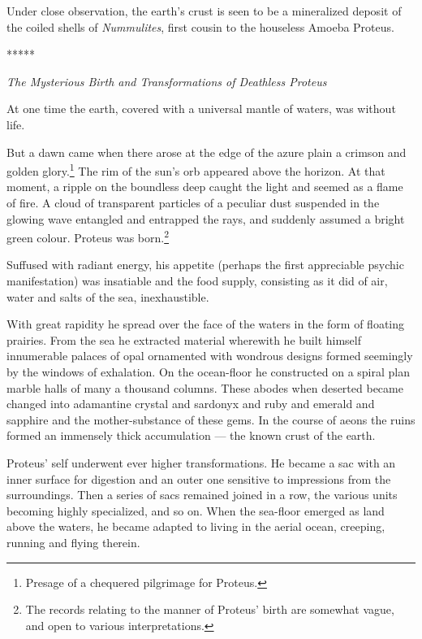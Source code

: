 \documentclass[a4paper, 12pt, oneside]{article}
\begin{document}
Under close observation, the earth's crust is seen to be a mineralized deposit of the coiled shells of \emph{Nummulites}, first cousin to the houseless Amoeba Proteus.

\centerline{*\hspace{15mm}*\hspace{15mm}*\hspace{15mm}*\hspace{15mm}*}
\bigskip

\centerline{\emph{The Mysterious Birth and Transformations of Deathless Proteus}}

At one time the earth, covered with a universal mantle of waters, was without life.

But a dawn came when there arose at the edge of the azure plain a crimson and golden glory.\footnote{Presage of a chequered pilgrimage for Proteus.} The rim of the sun's orb appeared above the horizon. At that moment, a ripple on the boundless deep caught the light and seemed as a flame of fire. A cloud of transparent particles of a peculiar dust suspended in the glowing wave entangled and entrapped the rays, and suddenly assumed a bright green colour. Proteus was born.\footnote{The records relating to the manner of Proteus' birth are somewhat vague, and open to various interpretations.}

Suffused with radiant energy, his appetite (perhaps the first appreciable psychic manifestation) was insatiable and the food supply, consisting as it did of air, water and salts of the sea, inexhaustible.

With great rapidity he spread over the face of the waters in the form of floating prairies. From the sea he extracted material wherewith he built himself innumerable palaces of opal ornamented with wondrous designs formed seemingly by the windows of exhalation. On the ocean-floor he constructed on a spiral plan marble halls of many a thousand columns. These abodes when deserted became changed into adamantine crystal and sardonyx and ruby and emerald and sapphire and the mother-substance of these gems. In the course of aeons the ruins formed an immensely thick accumulation --- the known crust of the earth.

Proteus' self underwent ever higher transformations. He became a sac with an inner surface for digestion and an outer one sensitive to impressions from the surroundings. Then a series of sacs remained joined in a row, the various units becoming highly specialized, and so on. When the sea-floor emerged as land above the waters, he became adapted to living in the aerial ocean, creeping, running and flying therein.
\end{document}

